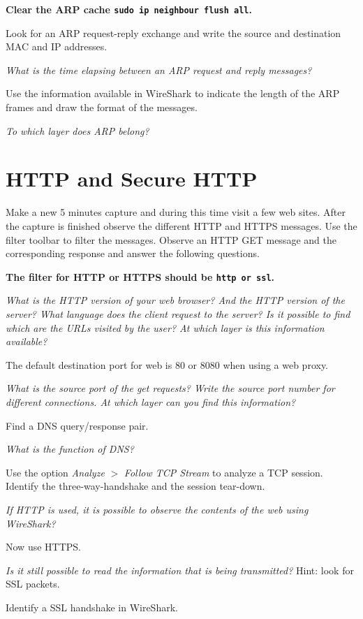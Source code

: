 \textbf{Clear the ARP cache \texttt{sudo ip neighbour flush all}.}

Look for an ARP request-reply exchange and write the source and destination MAC and IP addresses.

\emph{What is the time elapsing between an ARP request and reply messages?}

Use the information available in WireShark to indicate the length of the ARP frames and draw the format of the messages.

\emph{To which layer does ARP belong?}

\section{HTTP and Secure HTTP}

Make a new 5 minutes capture and during this time visit a few web sites. After the capture is finished observe the different HTTP and HTTPS messages.
Use the filter toolbar to filter the messages. Observe an HTTP GET message and the corresponding response and answer the following questions.

\textbf{The filter for HTTP or HTTPS should be \texttt{http or ssl}.}

\emph{What is the HTTP version of your web browser? And the HTTP version of the server? What language does the client request to the server? Is it possible to find which are the URLs visited by the user? At which layer is this information available?}

The default destination port for web is 80 or 8080 when using a web proxy.

\emph{What is the source port of the get requests? Write the source port number for different connections. At which layer can you find this information?}

Find a DNS query/response pair.

\emph{What is the function of DNS?}

Use the option \emph{Analyze} $>$ \emph{Follow TCP Stream} to analyze a TCP session. Identify the three-way-handshake and the session tear-down.

\emph{If HTTP is used, it is possible to observe the contents of the web using WireShark?}

Now use HTTPS.

\emph{Is it still possible to read the information that is being transmitted?} Hint: look for SSL packets.

Identify a SSL handshake in WireShark.

